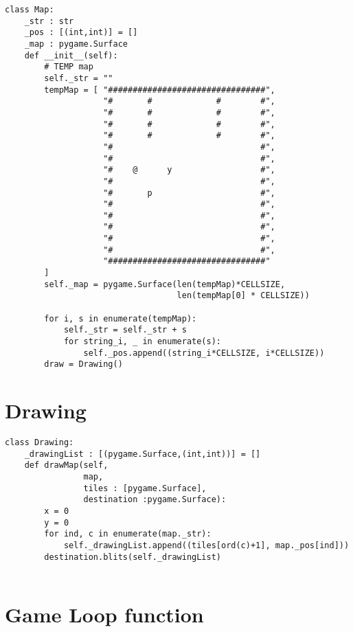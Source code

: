 \documentclass[11pt]{article}
\begin{document}
\begin{verbatim}
class Map:
    _str : str
    _pos : [(int,int)] = []
    _map : pygame.Surface
    def __init__(self):
        # TEMP map
        self._str = ""
        tempMap = [ "################################",
                    "#       #             #        #",
                    "#       #             #        #",
                    "#       #             #        #",
                    "#       #             #        #",
                    "#                              #",
                    "#                              #",
                    "#    @      y                  #",
                    "#                              #",
                    "#       p                      #",
                    "#                              #",
                    "#                              #",
                    "#                              #",
                    "#                              #",
                    "#                              #",
                    "################################"
        ]
        self._map = pygame.Surface(len(tempMap)*CELLSIZE,
                                   len(tempMap[0] * CELLSIZE))
        
        for i, s in enumerate(tempMap):
            self._str = self._str + s
            for string_i, _ in enumerate(s):
                self._pos.append((string_i*CELLSIZE, i*CELLSIZE))
        draw = Drawing()
\end{verbatim}



\section{Drawing}
\label{sec:org3893620}

\begin{verbatim}
class Drawing:
    _drawingList : [(pygame.Surface,(int,int))] = []
    def drawMap(self,
                map,
                tiles : [pygame.Surface],
                destination :pygame.Surface):
        x = 0
        y = 0
        for ind, c in enumerate(map._str):
            self._drawingList.append((tiles[ord(c)+1], map._pos[ind]))
        destination.blits(self._drawingList)
            
\end{verbatim}

\section{Game Loop function}
\label{sec:org1405179}
\end{document}
